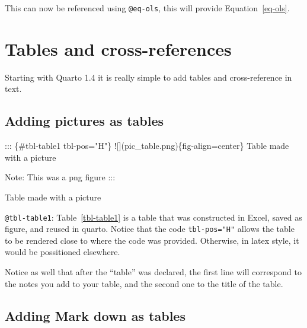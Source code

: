 \documentclass[
  11pts,
]{article}
\newenvironment{Shaded}{\begin{snugshade}}{\end{snugshade}}
\newcommand{\AlertTok}[1]{\textcolor[rgb]{0.68,0.00,0.00}{#1}}
\newcommand{\NormalTok}[1]{\textcolor[rgb]{0.00,0.23,0.31}{#1}}
\begin{document}
This can now be referenced using \texttt{@eq-ols}, this will provide
Equation~\ref{eq-ols}.

\section{Tables and cross-references}\label{tables-and-cross-references}

Starting with Quarto 1.4 it is really simple to add tables and
cross-reference in text.

\subsection{Adding pictures as tables}\label{adding-pictures-as-tables}

\begin{Shaded}
\begin{Highlighting}[]
\NormalTok{::: \{\#tbl{-}table1 tbl{-}pos="H"\}}
\AlertTok{![](pic\_table.png)}\NormalTok{\{fig{-}align=center\}}
\NormalTok{Table made with a picture}

\NormalTok{Note: This was a png figure}
\NormalTok{:::}
\end{Highlighting}
\end{Shaded}

\begin{table}[H]

\caption{\label{tbl-table1}Table made with a picture}


\end{table}%

\texttt{@tbl-table1}: Table~\ref{tbl-table1} is a table that was
constructed in Excel, saved as figure, and reused in quarto. Notice that
the code \texttt{tbl-pos="H"} allows the table to be rendered close to
where the code was provided. Otherwise, in latex style, it would be
possitioned elsewhere.

Notice as well that after the ``table'' was declared, the first line
will correspond to the notes you add to your table, and the second one
to the title of the table.

\subsection{Adding Mark down as
tables}\label{adding-mark-down-as-tables}
\end{document}

